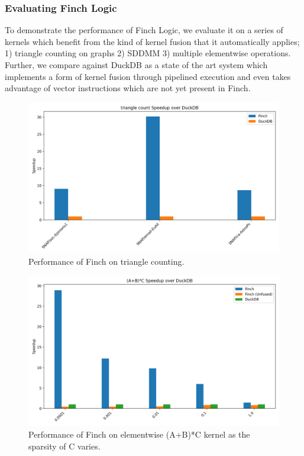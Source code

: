\subsubsection{Evaluating Finch Logic}
To demonstrate the performance of Finch Logic, we evaluate it on a series of kernels which benefit from the kind of kernel fusion that it automatically applies; 1) triangle counting on graphs 2) SDDMM 3) multiple elementwise operations. Further, we compare against DuckDB as a state of the art system which implements a form of kernel fusion through pipelined execution and even takes advantage of vector instructions which are not yet present in Finch.


\begin{figure}
	\includegraphics[width=\linewidth]{triangle_count_speedup_over_duckdb.png}
    \caption{Performance of Finch on triangle counting.}
\end{figure}

\begin{figure}
	\includegraphics[width=\linewidth]{elementwise_speedup_over_duckdb.png}
    \caption{Performance of Finch on elementwise (A+B)*C kernel as the sparsity of C varies.}
\end{figure}

